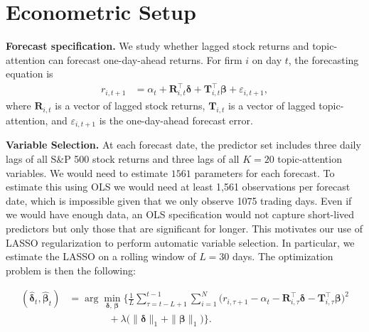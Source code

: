 \documentclass[10pt,twocolumn]{article}
\begin{document}
\begin{table}[H]
  \centering
  \caption{Summary statistics for returns and news}
  \label{tab:summstats}
  \setlength{\tabcolsep}{3pt}
  \renewcommand{\arraystretch}{1.05}
  \small
\end{table}


\section{Econometric Setup}
\label{sec:setup}

\textbf{Forecast specification.} 
We study whether lagged stock returns and topic-attention 
can forecast one-day-ahead returns. For firm $i$ on day $t$, the forecasting equation is
\begin{align}
r_{i,t+1} 
  &= \alpha_t + \mathbf{R}_{i,t}^{\!\top}\boldsymbol{\delta} 
     + \mathbf{T}_{i,t}^{\!\top}\boldsymbol{\beta} 
     + \varepsilon_{i,t+1}, 
\label{eq:lasso}
\end{align}
where $\mathbf{R}_{i,t}$ is a vector of lagged stock returns, $\mathbf{T}_{i,t}$ is a vector of lagged topic-attention, and $\varepsilon_{i,t+1}$ is the one-day-ahead forecast error.

\textbf{Variable Selection.} 
At each forecast date, the predictor set includes three daily lags of all S\&P 500 stock returns and three lags of all $K=20$ topic-attention variables. We would need to estimate $1561$ parameters for each forecast. To estimate this using OLS we would need at least 1,561 observations per forecast date, which is impossible given that we only observe 1075 trading days. Even if we would have enough data, an OLS specification would not capture short-lived predictors but only those that are significant for longer. This motivates our use of LASSO regularization to perform automatic variable selection. In particular, we estimate the LASSO on a rolling window of $L=30$ days. The optimization problem is then the following: 

\begin{align}
(\hat{\boldsymbol{\delta}}_t,\hat{\boldsymbol{\beta}}_t)
&= \arg\min_{\boldsymbol{\delta},\,\boldsymbol{\beta}}
\Bigg\{
\frac{1}{L}\sum_{\tau=t-L+1}^{t-1}\sum_{i=1}^{N}
\big(r_{i,\tau+1}-\alpha_t-\mathbf{R}_{i,\tau}^{\!\top}\boldsymbol{\delta}-\mathbf{T}_{i,\tau}^{\!\top}\boldsymbol{\beta}\big)^2 \nonumber\\
&\qquad\qquad
+ \lambda\big(\|\boldsymbol{\delta}\|_1+\|\boldsymbol{\beta}\|_1\big)
\Bigg\}.
\label{eq:lasso_opt}
\end{align}
\end{document}
